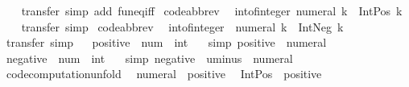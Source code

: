 \begin{isabellebody}
%
\isadelimproof
\ \ %
\endisadelimproof
%
\isatagproof
{}\isamarkupfalse%
\ transfer\ {\isacharparenleft}simp\ add{\isacharcolon}\ fun{\isacharunderscore}eq{\isacharunderscore}iff{\isacharparenright}%
\endisatagproof
{\isafoldproof}%
%
\isadelimproof
\isanewline
%
\endisadelimproof
\isanewline
{}\isamarkupfalse%
\ {\isacharbrackleft}code{\isacharunderscore}abbrev{\isacharbrackright}{\isacharcolon}\isanewline
\ \ {\isachardoublequoteopen}int{\isacharunderscore}of{\isacharunderscore}integer\ {\isacharparenleft}numeral\ k{\isacharparenright}\ {\isacharequal}\ Int{\isachardot}Pos\ k{\isachardoublequoteclose}\isanewline
%
\isadelimproof
\ \ %
\endisadelimproof
%
\isatagproof
{}\isamarkupfalse%
\ transfer\ simp%
\endisatagproof
{\isafoldproof}%
%
\isadelimproof
\isanewline
%
\endisadelimproof
\isanewline
{}\isamarkupfalse%
\ {\isacharbrackleft}code{\isacharunderscore}abbrev{\isacharbrackright}{\isacharcolon}\isanewline
\ \ {\isachardoublequoteopen}int{\isacharunderscore}of{\isacharunderscore}integer\ {\isacharparenleft}{\isacharminus}\ numeral\ k{\isacharparenright}\ {\isacharequal}\ Int{\isachardot}Neg\ k{\isachardoublequoteclose}\isanewline
%
\isadelimproof
\ \ %
\endisadelimproof
%
\isatagproof
{}\isamarkupfalse%
\ transfer\ simp%
\endisatagproof
{\isafoldproof}%
%
\isadelimproof
\isanewline
%
\endisadelimproof
\isanewline
{}\isamarkupfalse%
\isanewline
{}\isanewline
\isanewline
{}\ \isamarkupfalse%
\ positive\ {\isacharcolon}{\isacharcolon}\ {\isachardoublequoteopen}num\ {\isasymRightarrow}\ int{\isachardoublequoteclose}\isanewline
\ \ \ {\isacharbrackleft}simp{\isacharbrackright}{\isacharcolon}\ {\isachardoublequoteopen}positive\ {\isacharequal}\ numeral{\isachardoublequoteclose}\isanewline
\isanewline
{}\ \isamarkupfalse%
\ negative\ {\isacharcolon}{\isacharcolon}\ {\isachardoublequoteopen}num\ {\isasymRightarrow}\ int{\isachardoublequoteclose}\isanewline
\ \ \ {\isacharbrackleft}simp{\isacharbrackright}{\isacharcolon}\ {\isachardoublequoteopen}negative\ {\isacharequal}\ uminus\ {\isasymcirc}\ numeral{\isachardoublequoteclose}\isanewline
\isanewline
{}\isamarkupfalse%
\ {\isacharbrackleft}code{\isacharunderscore}computation{\isacharunderscore}unfold{\isacharbrackright}{\isacharcolon}\isanewline
\ \ {\isachardoublequoteopen}numeral\ {\isacharequal}\ positive{\isachardoublequoteclose}\isanewline
\ \ {\isachardoublequoteopen}Int{\isachardot}Pos\ {\isacharequal}\ positive{\isachardoublequoteclose}\isanewline

\end{isabellebody}
